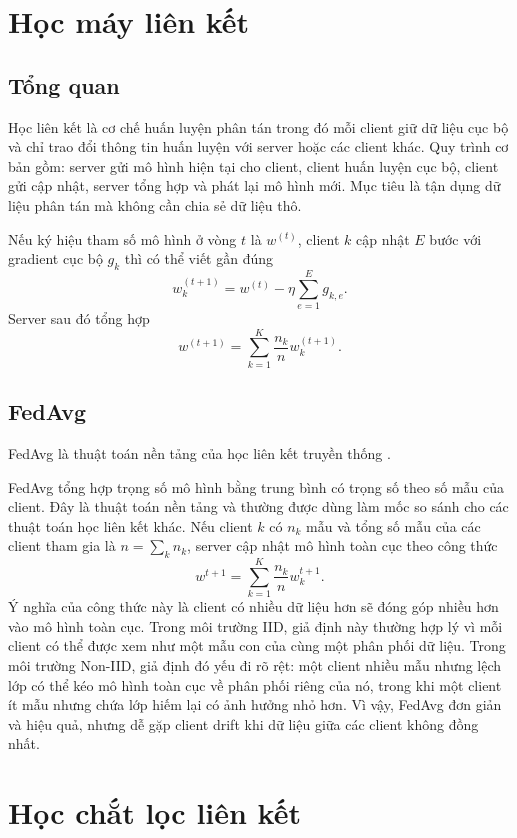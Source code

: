 \section{Học máy liên kết}

\subsection{Tổng quan}

Học liên kết là cơ chế huấn luyện phân tán trong đó mỗi client giữ dữ liệu cục bộ và chỉ trao đổi thông tin huấn luyện với server hoặc các client khác. Quy trình cơ bản gồm: server gửi mô hình hiện tại cho client, client huấn luyện cục bộ, client gửi cập nhật, server tổng hợp và phát lại mô hình mới. Mục tiêu là tận dụng dữ liệu phân tán mà không cần chia sẻ dữ liệu thô.

Nếu ký hiệu tham số mô hình ở vòng $t$ là $w^{(t)}$, client $k$ cập nhật $E$ bước với gradient cục bộ $g_k$ thì có thể viết gần đúng
$$
w_k^{(t+1)}=w^{(t)}-\eta\sum_{e=1}^{E} g_{k,e}.
$$
Server sau đó tổng hợp
$$
w^{(t+1)}=\sum_{k=1}^{K}\frac{n_k}{n}w_k^{(t+1)}.
$$

\subsection{FedAvg}

FedAvg là thuật toán nền tảng của học liên kết truyền thống \cite{fedavg}.

FedAvg tổng hợp trọng số mô hình bằng trung bình có trọng số theo số mẫu của client. Đây là thuật toán nền tảng và thường được dùng làm mốc so sánh cho các thuật toán học liên kết khác. Nếu client $k$ có $n_k$ mẫu và tổng số mẫu của các client tham gia là $n=\sum_k n_k$, server cập nhật mô hình toàn cục theo công thức
$$
w^{t+1}=\sum_{k=1}^{K}\frac{n_k}{n}w_k^{t+1}.
$$
Ý nghĩa của công thức này là client có nhiều dữ liệu hơn sẽ đóng góp nhiều hơn vào mô hình toàn cục. Trong môi trường IID, giả định này thường hợp lý vì mỗi client có thể được xem như một mẫu con của cùng một phân phối dữ liệu. Trong môi trường Non-IID, giả định đó yếu đi rõ rệt: một client nhiều mẫu nhưng lệch lớp có thể kéo mô hình toàn cục về phân phối riêng của nó, trong khi một client ít mẫu nhưng chứa lớp hiếm lại có ảnh hưởng nhỏ hơn. Vì vậy, FedAvg đơn giản và hiệu quả, nhưng dễ gặp client drift khi dữ liệu giữa các client không đồng nhất.

\section{Học chắt lọc liên kết}

